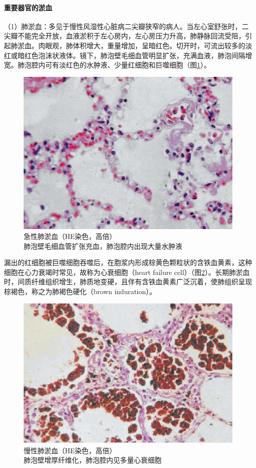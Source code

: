 \paragraph{重要器官的淤血}
（1）肺淤血：多见于慢性风湿性心脏病二尖瓣狭窄的病人。当左心室舒张时，二尖瓣不能完全开放，血液淤积于左心房内，左心房压力升高，肺静脉回流受阻，引起肺淤血。肉眼观，肺体积增大，重量增加，呈暗红色。切开时，可流出较多的淡红或暗红色泡沫状液体。镜下，肺泡壁毛细血管明显扩张，充满血液，肺泡间隔增宽。肺泡腔内可有淡红色的水肿液、少量红细胞和巨噬细胞（图\ref{fig3-1}）。
\begin{figure}[!htbp]
  \centering
  \includegraphics{./images/Image00034.jpg}
  \caption{急性肺淤血（HE染色，高倍）\\ {\small 肺泡壁毛细血管扩张充血，肺泡腔内出现大量水肿液}}
  \label{fig3-1}
\end{figure}


漏出的红细胞被巨噬细胞吞噬后，在胞浆内形成棕黄色颗粒状的含铁血黄素，这种细胞在心力衰竭时常见，故称为心衰细胞（heart
failure
cell）（图\ref{fig3-2}）。长期肺淤血时，间质纤维组织增生，肺质地变硬，且伴有含铁血黄素广泛沉着，使肺组织呈现棕褐色，称之为肺褐色硬化（brown
induration）。

\begin{figure}[!htbp]
  \centering
  \includegraphics{./images/Image00035.jpg}
  \caption{慢性肺淤血（HE染色，高倍）\\ {\small 肺泡壁增厚纤维化，肺泡腔内见多量心衰细胞}}
  \label{fig3-2}
\end{figure}

